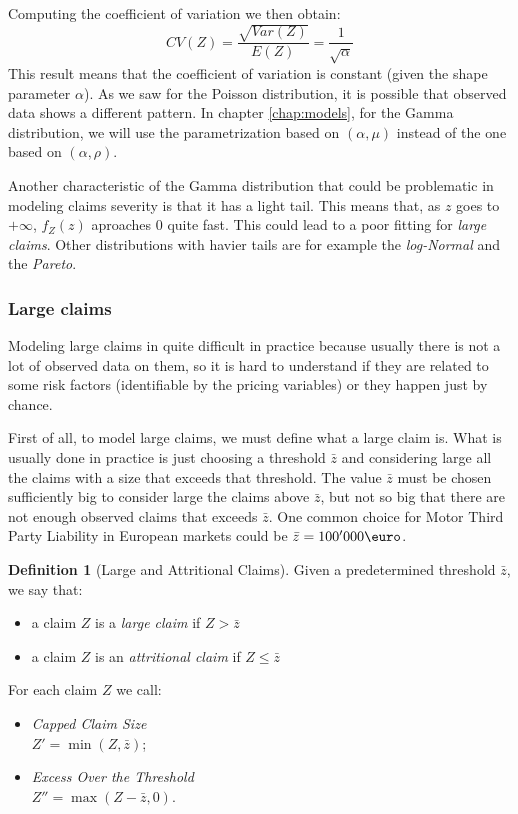 \documentclass[a4paper, twoside, openright, 12pt]{report}
\theoremstyle{definition}
\newtheorem{definition}{Definition}[chapter]
\theoremstyle{definition}
\theoremstyle{definition}
\theoremstyle{remark}
\begin{document}
Computing the coefficient of variation we then obtain:
\[CV(Z) = \frac{\sqrt{Var(Z)}}{E(Z)} = \frac{1}{\sqrt{\alpha}}\]
This result means that the coefficient of variation is constant (given the shape parameter \(\alpha\)). As we saw for the Poisson distribution, it is possible that observed data shows a different pattern. In chapter \ref{chap:models}, for the Gamma distribution, we will use the parametrization based on \((\alpha, \mu)\) instead of the one based on \((\alpha, \rho)\).

Another characteristic of the Gamma distribution that could be problematic in modeling claims severity is that it has a light tail. This means that, as \(z\) goes to \(+\infty\), \(f_Z(z)\) aproaches \(0\) quite fast. This could lead to a poor fitting for \emph{large claims}. Other distributions with havier tails are for example the \emph{log-Normal} and the \emph{Pareto}.

\hypertarget{chap:large-claims}{%
\subsubsection{Large claims}\label{chap:large-claims}}

Modeling large claims in quite difficult in practice because usually there is not a lot of observed data on them, so it is hard to understand if they are related to some risk factors (identifiable by the pricing variables) or they happen just by chance.

First of all, to model large claims, we must define what a large claim is. What is usually done in practice is just choosing a threshold \(\bar{z}\) and considering large all the claims with a size that exceeds that threshold. The value \(\bar{z}\) must be chosen sufficiently big to consider large the claims above \(\bar{z}\), but not so big that there are not enough observed claims that exceeds \(\bar{z}\). One common choice for Motor Third Party Liability in European markets could be \(\bar{z} = 100' 000 \text{\euro}\).

\begin{definition}[Large and Attritional Claims]
\label{def:def-large-claim} \iffalse (Large and Attritional Claims) \fi{} Given a predetermined threshold \(\bar{z}\), we say that:

\begin{itemize}
\item a claim $Z$ is a \textit{large claim} if $Z > \bar{z}$
\item a claim $Z$ is an \textit{attritional claim} if $Z \le \bar{z}$
\end{itemize}

For each claim \(Z\) we call:

\begin{itemize}
\item \textit{Capped Claim Size} \\
      $Z' = \min(Z, \bar{z})$;
\item \textit{Excess Over the Threshold} \\
      $Z'' = \max(Z - \bar{z}, 0)$.
\end{itemize}
\end{definition}
\end{document}
